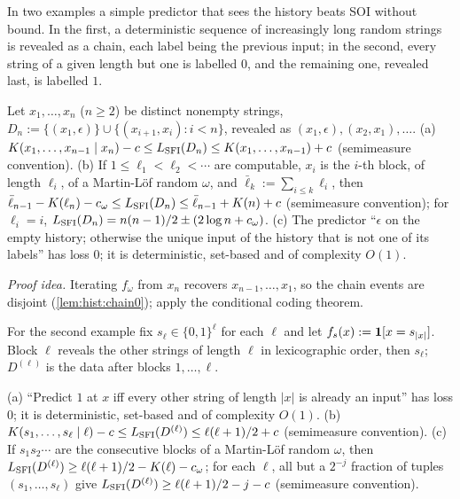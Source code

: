 In two examples a simple predictor that sees the history beats SOI without bound. In the first, a deterministic sequence of increasingly long random strings is revealed as a chain, each label being the previous input; in the second, every string of a given length but one is labelled $0$, and the remaining one, revealed last, is labelled $1$.

\begin{theorem}\label{thm:hist:chain}
Let $x_1,\dots,x_n$ ($n\ge2$) be distinct nonempty strings, $D_n:=\{(x_1,\epsilon)\}\cup\{(x_{i+1},x_i):i<n\}$, revealed as $(x_1,\epsilon),(x_2,x_1),\dots$.
(a) $K(x_1,\dots,x_{n-1}\mid x_n)-c\le L_{\mathrm{SFI}}(D_n)\le K(x_1,\dots,x_{n-1})+c$ (semimeasure convention).
(b) If $1\le\ell_1<\ell_2<\cdots$ are computable, $x_i$ is the $i$-th block, of length $\ell_i$, of a Martin-L\"of random $\omega$, and $\bar\ell_k:=\sum_{i\le k}\ell_i$, then $\bar\ell_{n-1}-K(\ell_n)-c_\omega\le L_{\mathrm{SFI}}(D_n)\le\bar\ell_{n-1}+K(n)+c$ (semimeasure convention); for $\ell_i=i$, $L_{\mathrm{SFI}}(D_n)=n(n-1)/2\pm(2\log n+c_\omega)$.
(c) The predictor ``$\epsilon$ on the empty history; otherwise the unique input of the history that is not one of its labels'' has loss $0$; it is deterministic, set-based and of complexity $O(1)$.
\end{theorem}

\emph{Proof idea.} Iterating $f_\omega$ from $x_n$ recovers $x_{n-1},\dots,x_1$, so the chain events are disjoint (\cref{lem:hist:chain0}); apply the conditional coding theorem.

For the second example fix $s_\ell\in\{0,1\}^\ell$ for each $\ell$ and let $f_s(x):=\mathbf{1}[x=s_{|x|}]$. Block $\ell$ reveals the other strings of length $\ell$ in lexicographic order, then $s_\ell$; $D^{(\ell)}$ is the data after blocks $1,\dots,\ell$.

\begin{theorem}\label{thm:hist:skipped}
(a) ``Predict $1$ at $x$ iff every other string of length $|x|$ is already an input'' has loss $0$; it is deterministic, set-based and of complexity $O(1)$. (b) $K(s_1,\dots,s_\ell\mid\ell)-c\le L_{\mathrm{SFI}}(D^{(\ell)})\le\ell(\ell+1)/2+c$ (semimeasure convention). (c) If $s_1s_2\cdots$ are the consecutive blocks of a Martin-L\"of random $\omega$, then $L_{\mathrm{SFI}}(D^{(\ell)})\ge\ell(\ell+1)/2-K(\ell)-c_\omega$; for each $\ell$, all but a $2^{-j}$ fraction of tuples $(s_1,\dots,s_\ell)$ give $L_{\mathrm{SFI}}(D^{(\ell)})\ge\ell(\ell+1)/2-j-c$ (semimeasure convention).
\end{theorem}

